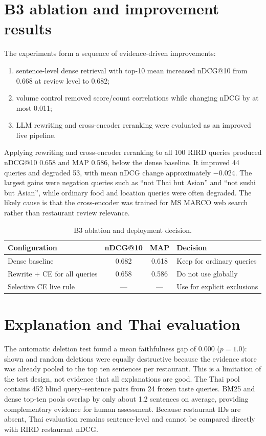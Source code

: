 \section{B3 ablation and improvement results}
The experiments form a sequence of evidence-driven improvements:
\begin{enumerate}
\item sentence-level dense retrieval with top-10 mean increased nDCG@10 from 0.668 at review
level to 0.682;
\item volume control removed score/count correlations while changing nDCG by at most 0.011;
\item LLM rewriting and cross-encoder reranking were evaluated as an improved live pipeline.
\end{enumerate}
Applying rewriting and cross-encoder reranking to all 100 RIRD queries produced nDCG@10
0.658 and MAP 0.586, below the dense baseline. It improved 44 queries and degraded 53, with
mean nDCG change approximately $-0.024$. The largest gains were negation queries such as
``not Thai but Asian'' and ``not sushi but Asian'', while ordinary food and location queries
were often degraded. The likely cause is that the cross-encoder was trained for MS MARCO web
search rather than restaurant review relevance.

\begin{table}[H]
\centering\small
\caption{B3 ablation and deployment decision.}
\label{tab:b3}
\begin{tabular}{@{}lccp{5.0cm}@{}}
\toprule
Configuration & nDCG@10 & MAP & Decision\\
\midrule
Dense baseline & 0.682 & 0.618 & Keep for ordinary queries\\
Rewrite + CE for all queries & 0.658 & 0.586 & Do not use globally\\
Selective CE live rule & --- & --- & Use for explicit exclusions\\
\bottomrule
\end{tabular}
\end{table}

\section{Explanation and Thai evaluation}
The automatic deletion test found a mean faithfulness gap of 0.000 ($p=1.0$): shown and
random deletions were equally destructive because the evidence store was already pooled to the
top ten sentences per restaurant. This is a limitation of the test design, not evidence that
all explanations are good. The Thai pool contains 452 blind query--sentence pairs from 24
frozen taste queries. BM25 and dense top-ten pools overlap by only about 1.2 sentences on
average, providing complementary evidence for human assessment. Because restaurant IDs are
absent, Thai evaluation remains sentence-level and cannot be compared directly with RIRD
restaurant nDCG.
